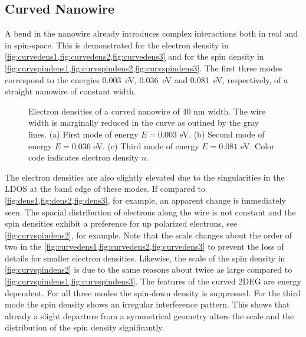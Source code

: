 \subsection{Curved Nanowire}
A bend in the nanowire already introduces complex interactions both in real and in spin-space. This is demonstrated for the electron density in \cref{fig:curvedens1,fig:curvedens2,fig:curvedens3} and for the spin density in \cref{fig:curvspindens1,fig:curvspindens2,fig:curvspindens3}. The first three modes correspond to the energies 0.003~eV, 0.036~eV and 0.081~eV, respectively, of a straight nanowire of constant width.\par
\begin{figure}[h!]
  \centering
  \caption{Electron densities of a curved nanowire of 40 nm width. The wire width is marginally reduced in the curve as outined by the gray lines. (a) First mode of energy $E=0.003$ eV. (b) Second mode of energy $E=0.036$ eV. (c) Third mode of energy $E=0.081$ eV. Color code indicates electron density $n$.}
\end{figure}
The electron densities are also slightly elevated due to the singularities in the LDOS at the band edge of these modes. If compared to \cref{fig:dens1,fig:dens2,fig:dens3}, for example, an apparent change is immediately seen. The spacial distribution of electrons along the wire is not constant and the spin densities exhibit a preference for up polarized electrons, see \cref{fig:curvspindens2}, for example. Note that the scale changes about the order of two in the \cref{fig:curvedens1,fig:curvedens2,fig:curvedens3} to prevent the loss of details for smaller electron densities. Likewise, the scale of the spin density in \cref{fig:curvspindens2} is due to the same reasons about twice as large compared to \cref{fig:curvspindens1,fig:curvspindens3}. The features of the curved 2DEG are energy dependent. For all three modes the spin-down density is suppressed. For the third mode the spin density shows an irregular interference pattern. This shows that already a slight departure from a symmetrical geometry alters the scale and the distribution of the spin density significantly.\par
